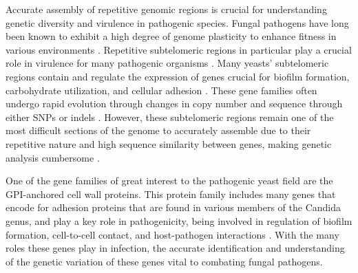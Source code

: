 Accurate assembly of repetitive genomic regions is crucial for understanding genetic diversity and virulence in pathogenic species. Fungal pathogens have long been known to exhibit a high degree of genome plasticity to enhance fitness in various environments \citep{Croll2013-mm, Ford2015-qs, Lopez-Fuentes2018-zt, Carrete2019-xo, Todd2019-sy}. Repetitive subtelomeric regions in particular play a crucial role in virulence for many pathogenic organisms \citep{Barry2003-ln, De_Las_Penas2003-zd}. Many yeasts’ subtelomeric regions contain and regulate the expression of genes crucial for biofilm formation, carbohydrate utilization, and cellular adhesion \citep{Naumov1995-ju,  De_Las_Penas2003-zd, Iraqui2005-hy}. These gene families often undergo rapid evolution through changes in copy number and sequence through either SNPs or indels \citep{Carreto2008-pz, Brown2010-az, Anderson2015-fa}. However, these subtelomeric regions remain one of the most difficult sections of the genome to accurately assemble due to their repetitive nature and high sequence similarity between genes, making genetic analysis cumbersome \citep{Brown2010-az}.

One of the gene families of great interest to the pathogenic yeast field are the GPI-anchored cell wall proteins. This protein family includes many genes that encode for adhesion proteins that are found in various members of the Candida genus, and play a key role in pathogenicity, being involved in regulation of biofilm formation, cell-to-cell contact, and host-pathogen interactions \citep{Timmermans2018-ci, McCall2019-zn}. With the many roles these genes play in infection, the accurate identification and understanding of the genetic variation of these genes vital to combating fungal pathogens.

